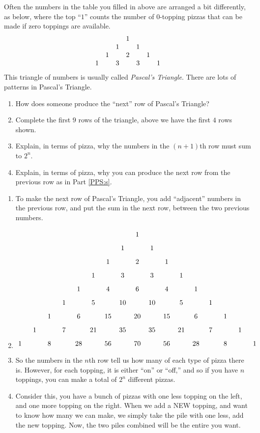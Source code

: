 \documentclass[noauthor,nooutcomes,12pt,hints,handout]{ximera}
\begin{document}
\begin{question}
  Often the numbers in the table you filled in above are arranged a
  bit differently, as below, where the top ``$1$'' counts the number
  of $0$-topping pizzas that can be made if zero toppings are
  available.
  \[
  \begin{array}{c c c c c c c}
    &   &   & 1 &   &   &  \\
    &   & 1 &   & 1 &   &  \\
    & 1 &   & 2 &   & 1 &  \\
    1 &   & 3 &   & 3 &   & 1
  \end{array}
  \]
This triangle of numbers is usually called \textit{Pascal's
  Triangle}. There are lots of patterns in
Pascal's Triangle.
\begin{enumerate}
  \item\label{PPS:s} How does someone produce the ``next'' row of Pascal's
    Triangle? 
  \item Complete the first $9$ rows of the triangle, above we have the
    first $4$ rows shown.
  \item Explain, in terms of pizza, why the numbers in the $(n+1)$th row
    must sum to $2^n$.
  \item Explain, in terms of pizza, why you can produce the next row
    from the previous row as in Part \ref{PPS:s}.
\end{enumerate}
\begin{freeResponse}
  \begin{enumerate}
  \item To make the next row of Pascal's Triangle, you add
    ``adjacent'' numbers in the previous row, and put the sum in the
    next row, between the two previous numbers.
  \item
    \[%
    \begin{tikzpicture}
      \foreach \n in {0,...,8} {
        \foreach \k in {0,...,\n} {
          \node at ({1.5*(\k-\n/2)},-\n*.7) {\binomialCoefficient{\n}{\k}};
        }
      }
    \end{tikzpicture}
    \]
  \item So the numbers in the $n$th row tell us how many of each type
    of pizza there is. However, for each topping, it is either ``on''
    or ``off,'' and so if you have $n$ toppings, you can make a total
    of $2^n$ different pizzas.
  \item Consider this, you have a bunch of pizzas with one less
    topping on the left, and one more topping on the right. When we
    add a NEW topping, and want to know how many we can make, we
    simply take the pile with one less, add the new topping.  Now, the
    two piles combined will be the entire you want.

  \end{enumerate}
\end{freeResponse}
\end{question}
\end{document}
